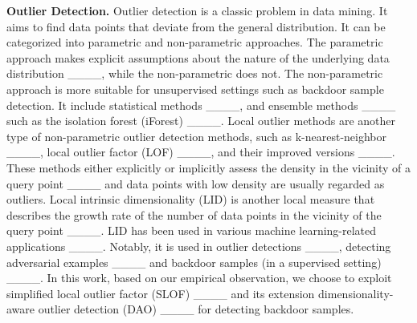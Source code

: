 \noindent\textbf{Outlier Detection.}
Outlier detection is a classic problem in data mining. It aims to find data points that deviate from the general distribution. It can be categorized into parametric and non-parametric approaches. The parametric approach makes explicit assumptions about the nature of the underlying data distribution ____, while the non-parametric does not. 
The non-parametric approach is more suitable for unsupervised settings such as backdoor sample detection. 
It include statistical methods ____, and ensemble methods ____ such as the isolation forest (iForest) ____. 
Local outlier methods are another type of non-parametric outlier detection methods, such as k-nearest-neighbor ____, local outlier factor (LOF) ____, and their improved versions ____. 
These methods either explicitly or implicitly assess the density in the vicinity of a query point ____ and data points with low density are usually regarded as outliers. 
 Local intrinsic dimensionality (LID) is another local measure that describes the growth rate of the number of data points in the vicinity of the query point ____. LID has been used in various machine learning-related applications ____. Notably, it is used in outlier detections ____, detecting adversarial examples ____ and backdoor samples (in a supervised setting) ____. 
In this work, based on our empirical observation, we choose to exploit simplified local outlier factor (SLOF) ____ and its extension dimensionality-aware outlier detection (DAO) ____ 
for detecting backdoor samples.